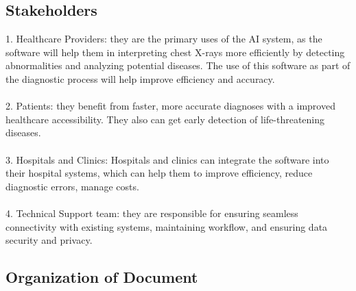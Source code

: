 \documentclass[12pt]{article}
\begin{document}
\subsection{Stakeholders}
1. Healthcare Providers: they are the primary uses of the AI system, as the software will help them in interpreting chest X-rays more efficiently by detecting abnormalities and analyzing potential diseases. The use of this software as part of the diagnostic process will help improve efficiency and accuracy.
\\
\\
2. Patients: they benefit from faster, more accurate diagnoses with a improved healthcare accessibility. They also can get early detection of life-threatening diseases.\\
\\
3. Hospitals and Clinics: Hospitals and clinics can integrate the software into their hospital systems, which can help them to improve efficiency, reduce diagnostic errors, manage costs.\\
\\
4. Technical Support team: they are responsible for ensuring seamless connectivity with existing systems, maintaining workflow, and ensuring data security and privacy. \\

\subsection{Organization of Document}
\end{document}
